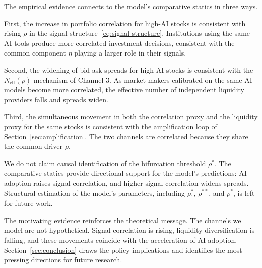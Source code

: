 The empirical evidence connects to the model's comparative statics in three ways.

First, the increase in portfolio correlation for high-AI stocks is consistent with rising $\rho$ in the signal structure~\eqref{eq:signal-structure}. Institutions using the same AI tools produce more correlated investment decisions, consistent with the common component $\eta$ playing a larger role in their signals.

Second, the widening of bid-ask spreads for high-AI stocks is consistent with the $N_{\text{eff}}(\rho)$ mechanism of Channel 3. As market makers calibrated on the same AI models become more correlated, the effective number of independent liquidity providers falls and spreads widen.

Third, the simultaneous movement in both the correlation proxy and the liquidity proxy for the same stocks is consistent with the amplification loop of Section~\ref{sec:amplification}. The two channels are correlated because they share the common driver $\rho$.

We do not claim causal identification of the bifurcation threshold $\rho^*$. The comparative statics provide directional support for the model's predictions: AI adoption raises signal correlation, and higher signal correlation widens spreads. Structural estimation of the model's parameters, including $\rho_1^*$, $\rho^{**}$, and $\rho^*$, is left for future work.

The motivating evidence reinforces the theoretical message. The channels we model are not hypothetical. Signal correlation is rising, liquidity diversification is falling, and these movements coincide with the acceleration of AI adoption. Section~\ref{sec:conclusion} draws the policy implications and identifies the most pressing directions for future research.

